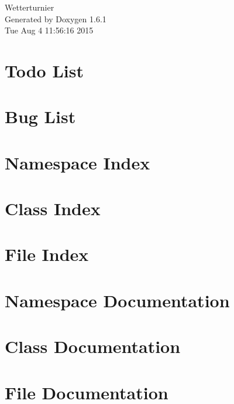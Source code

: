 \documentclass[a4paper]{article}
\begin{document}
\hypersetup{pageanchor=false}
\begin{titlepage}
\vspace*{7cm}
\begin{center}
{\Large Wetterturnier }\\
\vspace*{1cm}
{\large Generated by Doxygen 1.6.1}\\
\vspace*{0.5cm}
{\small Tue Aug 4 11:56:16 2015}\\
\end{center}
\end{titlepage}
\tableofcontents
{}
\hypersetup{pageanchor=true}
\section{Todo List}
\label{todo}
\hypertarget{todo}{}

\section{Bug List}
\label{bug}
\hypertarget{bug}{}

\section{Namespace Index}

\section{Class Index}

\section{File Index}

\section{Namespace Documentation}










\section{Class Documentation}






\section{File Documentation}










\printindex
\end{document}
